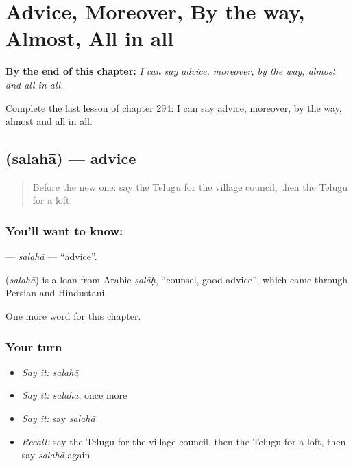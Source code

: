 
\chapter{Advice, Moreover, By the way, Almost, All in all}
\label{ch:te-advice-moreover-by-the-way-almost-all-in-all}

\begin{chapteropening}
\textbf{By the end of this chapter:} \emph{I can say advice, moreover, by the way, almost and all in all.}

Complete the last lesson of chapter 294: I can say advice, moreover, by the way, almost and all in all.
\end{chapteropening}

\section[\texorpdfstring{\te{సలహా} (salahā)}{సలహా (salahā)}]{ (salahā) — advice}

\label{lesson:TE-C294-salaha}



\begin{quote}
Before the new one: say the Telugu for the village council, then the Telugu for a loft.
\end{quote}

\subsection*{You'll want to know: }
\textbf{} — \emph{salahā} — \textquotedblleft{}advice\textquotedblright{}.

\begin{cousinweb}
\textbf{} (\emph{salahā}) is a loan from Arabic \emph{ṣalāḥ}, \textquotedblleft{}counsel, good advice\textquotedblright{}, which came through Persian and Hindustani.
\end{cousinweb}

\begin{grammarlens}[title={What you've built}]
One more word for this chapter.
\end{grammarlens}

\subsection*{Your turn}
\begin{itemize}
\raggedright
  \item \emph{Say it:} \emph{salahā}
  \item \emph{Say it:} \emph{salahā}, once more
  \item \emph{Say it:} say \emph{salahā}
  \item \emph{Recall:} say the Telugu for the village council, then the Telugu for a loft, then say \emph{salahā} again
\end{itemize}


